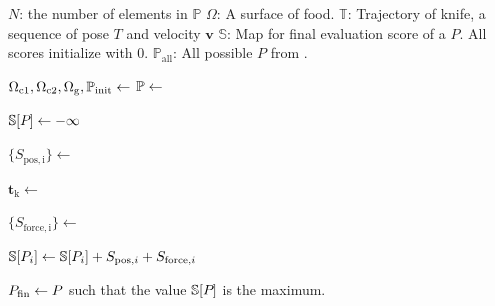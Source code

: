 \begin{algorithm}[H]
\caption{Full progress}\label{algo:holding_global}

\begin{algorithmic}[1]
\setlength{\baselineskip}{11pt}
\State $N$: the number of elements in $\mathbb{P}$
\State $\Omega$: A surface of food.
\State $\mathbb{T}$: Trajectory of knife, a sequence of pose $T$ and velocity $\bm v$
\State $\mathbb{S}$: Map for final evaluation score of a {\nameholdingpointsetENG} $P$. All scores initialize with 0.
\State $\mathbb{P}_\mathrm{all}$: All possible {\nameholdingpointsetENG} $P$ from \fix[$\Omega$].

\State
{}  \label{algoline:holding_global-knifepose-for-st}

    \State $\Omega_{\mathrm{c1}}, \Omega_{\mathrm{c2}}, \Omega_{\mathrm{g}}, \mathbb{P}_\mathrm{init} \gets $  \label{algoline:holding_exp1-st}    \label{algoline:holding_global-PrepareData}
    \State $\mathbb{P} \gets $

      \label{algoline:holding_global-set-inf-score-st}
        \State $\mathbb{S}[\equholdingpointset] \gets -\infty$
    \EndFor  \label{algoline:holding_global-set-inf-score-ed}
  
    \State $\{S_\mathrm{pos, i}\} \gets$  

    \State $\bm{t}_\mathrm{k} \gets $  \label{algoline:holding_global-CalKnifeForce} \label{algoline:holding_global-filter-force-st}

    \State $\{S_\mathrm{force, i}\} \gets$  \label{algoline:holding_global-caldynamicscore}
  
     \label{algoline:holding_global-accumulate-forcescore-st}
        \State $ \mathbb{S}[\equholdingpointset[][i]] \gets \mathbb{S}[\equholdingpointset[][i]] + S_{\mathrm{pos}, i} + S_{\mathrm{force}, i}$
    \EndFor \label{algoline:holding_global-point-for-ed} \label{algoline:holding_global-filter-force-ed}  \label{algoline:holding_global-accumulate-forcescore-ed}
  
\EndFor  \label{algoline:holding_global-knifepose-for-ed}

\State $\equholdingpointset[fin] \gets P$ such that the value $\mathbb{S}[\equholdingpointset]$ is the maximum.

\end{algorithmic}
\end{algorithm}

